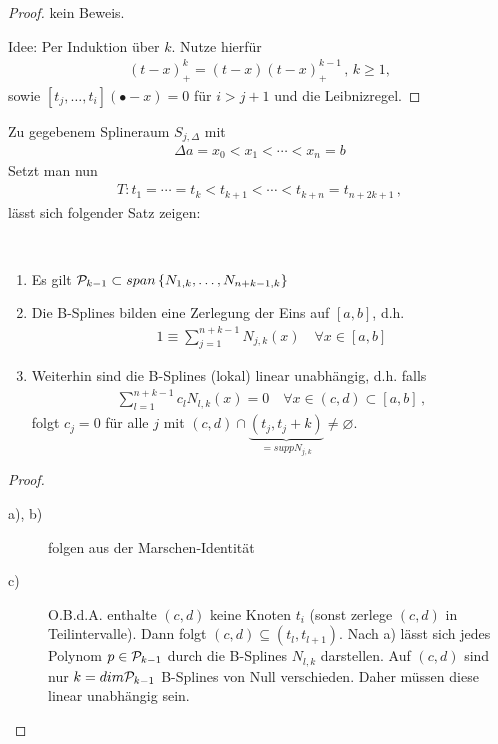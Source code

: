 \begin{proof}
  kein Beweis.

  Idee: Per Induktion über $k$. Nutze hierfür
  \begin{gather*}
    (t-x)_{+}^k = (t-x)(t-x)_{+}^{k-1}\,,\, k \geq 1,
  \end{gather*}
  sowie $[t_j , \dotsc, t_i]( \bullet - x) = 0$ für $i > j+1$ und die Leibnizregel.
\end{proof}

Zu gegebenem Splineraum $S_{j,\Delta}$ mit
\begin{gather}
  \Delta a=x_0 < x_1 < \dotsm < x_n = b
  \label{VI.2.6}
\end{gather}
Setzt man nun 
\begin{gather}
  T: t_1 = \dotsm = t_k < t_{k+1} < \dotsm < t_{k+n} =
  t_{n+2k+1}\, ,
  \label{VI.2.7}
\end{gather} lässt sich folgender Satz zeigen:




\begin{Satze}\label{6.2.10}~
  \begin{enumerate}
  \item Es gilt 
    $\mathcal{P}_{k-1}\subset
    span\left\{N_{1,k}, \dots, N_{n+k-1,k}\right\}$
  \item Die B-Splines bilden eine Zerlegung der Eins auf $[a,b]$,
    d.h. 
    \begin{gather*}
      1\equiv \sum_{j=1}^{n+k-1}N_{j,k}(x) \quad \forall x\in[a,b]
    \end{gather*}
  \item Weiterhin sind die B-Splines (lokal) linear unabhängig,
    d.h. falls
    \begin{gather*}
      \sum_{l=1}^{n+k-1}c_lN_{l,k}(x)=0 
      \quad\forall x\in(c,d)\subset [a,b]\,,
    \end{gather*}
    folgt $c_j=0$ für alle $j$ mit 
    $(c,d)\cap \underbrace{(t_j,t_j+k)}_{=supp N_{j,k}}\neq \varnothing$.
    \label{im6.2.10}
  \end{enumerate}

  \begin{proof}~
    \begin{description}
    \item[a), b)] folgen aus der Marschen-Identität 
      \cite[siehe z.B.][]{deuflhardhohmann}
    \item[c)] O.B.d.A. enthalte $(c,d)$ keine Knoten $t_i$
      (sonst zerlege $(c,d)$ in Teilintervalle).
      Dann folgt $(c,d)\subseteq (t_l, t_{l+1})$.
      Nach a) lässt sich jedes Polynom $p\in \mathcal{P}_{k-1}$
      durch die B-Splines $N_{l,k}$ darstellen.
      Auf $(c,d)$ sind nur $k=dim\mathcal{P}_{k-1}$
      B-Splines von Null verschieden.
      Daher müssen diese linear unabhängig sein.
    \end{description}
  \end{proof}
\end{Satze}

